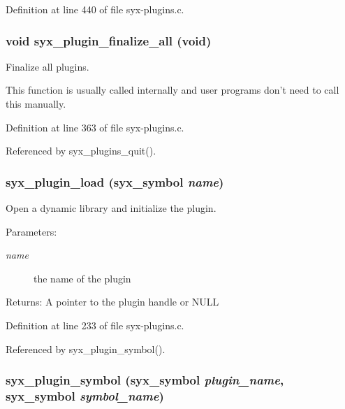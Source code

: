 Definition at line 440 of file syx-plugins.c.\hypertarget{syx-plugins_8c_2fdd83073eecb3faae4d70d95d0891e1}{
\subsubsection{\setlength{\rightskip}{0pt plus 5cm}void syx\_\-plugin\_\-finalize\_\-all (void)}}
\label{syx-plugins_8c_2fdd83073eecb3faae4d70d95d0891e1}


Finalize all plugins.

This function is usually called internally and user programs don't need to call this manually. 

Definition at line 363 of file syx-plugins.c.

Referenced by syx\_\-plugins\_\-quit().\hypertarget{syx-plugins_8c_3a83182999fbe72d438b68bcf78d1dcf}{
\subsubsection{ syx\_\-plugin\_\-load ({\bf syx\_\-symbol} {\em name})}}
\label{syx-plugins_8c_3a83182999fbe72d438b68bcf78d1dcf}


Open a dynamic library and initialize the plugin.

\begin{Desc}
\item[Parameters:]
\begin{description}
\item[{\em name}]the name of the plugin \end{description}
\end{Desc}
\begin{Desc}
\item[Returns:]A pointer to the plugin handle or NULL \end{Desc}


Definition at line 233 of file syx-plugins.c.

Referenced by syx\_\-plugin\_\-symbol().\hypertarget{syx-plugins_8c_a502d3b593c9e0feabd2f6575d4326f0}{
\subsubsection{ syx\_\-plugin\_\-symbol ({\bf syx\_\-symbol} {\em plugin\_\-name}, \/  {\bf syx\_\-symbol} {\em symbol\_\-name})}}
\label{syx-plugins_8c_a502d3b593c9e0feabd2f6575d4326f0}


